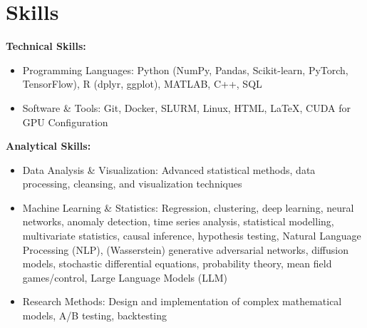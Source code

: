 \section{Skills}
\textbf{Technical Skills:}
\begin{itemize}[leftmargin=*]
    \item Programming Languages: Python (NumPy, Pandas, Scikit-learn, PyTorch, TensorFlow), R (dplyr, ggplot), MATLAB, C++, SQL
    \item Software \& Tools: Git, Docker, SLURM, Linux, HTML, \LaTeX, CUDA for GPU Configuration
\end{itemize}
\textbf{Analytical Skills:}
\begin{itemize}[leftmargin=*]
    \item Data Analysis \& Visualization: Advanced statistical methods, data processing, cleansing, and visualization techniques
    \item Machine Learning \& Statistics: Regression, clustering, deep learning, neural networks, anomaly detection, time series analysis, statistical modelling, multivariate statistics, causal inference, hypothesis testing, Natural Language Processing (NLP), (Wasserstein) generative adversarial networks, diffusion models, stochastic differential equations, probability theory, mean field games/control, Large Language Models (LLM)
    \item Research Methods: Design and implementation of complex mathematical models, A/B testing, backtesting
\end{itemize}

